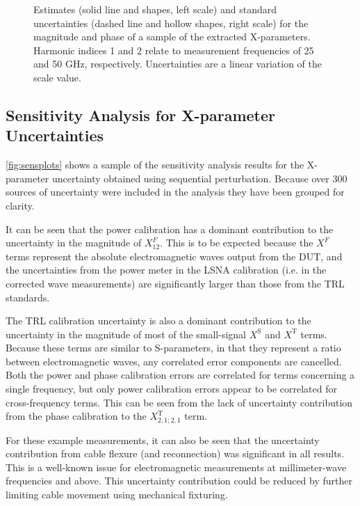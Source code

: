 \documentclass[../thesis/thesis.tex]{subfiles}
\begin{document}
\begin{refsection}
\begin{figure}
\begin{subfigure}{0.45\textwidth}
		\label{ch5_fig_t212kp}
	\end{subfigure}
	\caption{Estimates (solid line and shapes, left scale) and standard uncertainties (dashed line and hollow shapes, right scale) for the magnitude and phase of a sample of the extracted X-parameters. Harmonic indices 1 and 2 relate to measurement frequencies of 25 and 50 GHz, respectively. Uncertainties are a linear variation of the scale value.}
	\label{ch5_fig_summaryplots}
\end{figure}

\subsection{Sensitivity Analysis for X-parameter Uncertainties}

\figurename{ \ref{fig:sensplots}} shows a sample of the sensitivity analysis results for the X-parameter uncertainty obtained using sequential perturbation. Because over 300 sources of uncertainty were included in the analysis they have been grouped for clarity.

It can be seen that the power calibration has a dominant contribution to the uncertainty in the magnitude of $X^F_{12}$. This is to be expected because the $X^F$ terms represent the absolute electromagnetic waves output from the DUT, and the uncertainties from the power meter in the LSNA calibration (i.e. in the corrected wave measurements) are significantly larger than those from the TRL standards.

The TRL calibration uncertainty is also a dominant contribution to the uncertainty in the magnitude of most of the small-signal $X^\textrm{S}$ and $X^\textrm{T}$ terms. Because these terms are similar to S-parameters, in that they represent a ratio between electromagnetic waves, any correlated error components are cancelled. Both the power and phase calibration errors are correlated for terms concerning a single frequency, but only power calibration errors appear to be correlated for cross-frequency terms. This can be seen from the lack of uncertainty contribution from the phase calibration to the $X^\textrm{T}_{2,1;2,1}$ term.

For these example measurements, it can also be seen that the uncertainty contribution from cable flexure (and reconnection) was significant in all results. This is a well-known issue for electromagnetic measurements at millimeter-wave frequencies and above. This uncertainty contribution could be reduced by further limiting cable movement using mechanical fixturing.


\end{refsection}
\end{document}
